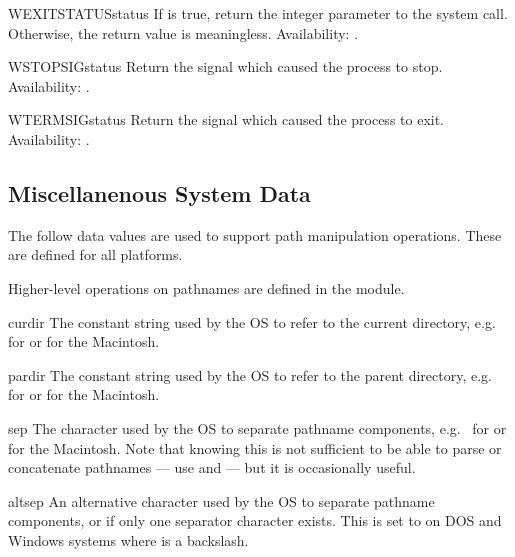 \begin{funcdesc}{WEXITSTATUS}{status}
If  is true, return the integer
parameter to the  system call.  Otherwise, the return 
value is meaningless.
Availability: \UNIX{}.
\end{funcdesc}

\begin{funcdesc}{WSTOPSIG}{status}
Return the signal which caused the process to stop.
Availability: \UNIX{}.
\end{funcdesc}

\begin{funcdesc}{WTERMSIG}{status}
Return the signal which caused the process to exit.
Availability: \UNIX{}.
\end{funcdesc}


\subsection{Miscellanenous System Data \label{os-path}}

The follow data values are used to support path manipulation
operations.  These are defined for all platforms.

Higher-level operations on pathnames are defined in the
 module.


\begin{datadesc}{curdir}
The constant string used by the OS to refer to the current directory,
e.g.\  for \POSIX{} or  for the Macintosh.
\end{datadesc}

\begin{datadesc}{pardir}
The constant string used by the OS to refer to the parent directory,
e.g.\  for \POSIX{} or  for the Macintosh.
\end{datadesc}

\begin{datadesc}{sep}
The character used by the OS to separate pathname components,
e.g.\ \character{/} for \POSIX{} or \character{:} for the Macintosh.
Note that knowing this is not sufficient to be able to parse or
concatenate pathnames --- use  and
 --- but it is occasionally useful.
\end{datadesc}

\begin{datadesc}{altsep}
An alternative character used by the OS to separate pathname components,
or  if only one separator character exists.  This is set to
\character{/} on DOS and Windows systems where  is a backslash.
\end{datadesc}

